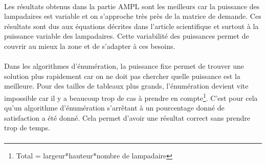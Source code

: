  \paragraph{}
Les résultats obtenus dans la partie AMPL sont les meilleurs car la puissance des lampadaires est variable et on s'approche très près de la matrice de demande. Ces résultats sont dus aux équations décrites dans l'article scientifique et surtout à la puissance variable des lampadaires. Cette variabilité des puissances permet de couvrir au mieux la zone et de s'adapter à ces besoins. 

\paragraph{}
Dans les algorithmes d'énumération, la puissance fixe permet de trouver une solution plus rapidement car on ne doit pas chercher quelle puissance est la meilleure. Pour des tailles de tableaux plus grands, l'énumération devient vite impossible car il y a beaucoup trop de cas à prendre en compte\footnote{Total = largeur*hauteur*nombre de lampadaire}. C'est pour cela qu'un algorithme d'énumération s'arrêtant à un pourcentage donné de satisfaction a été donné. Cela permet d'avoir une résultat correct sans prendre trop de temps.


\paragraph{}
